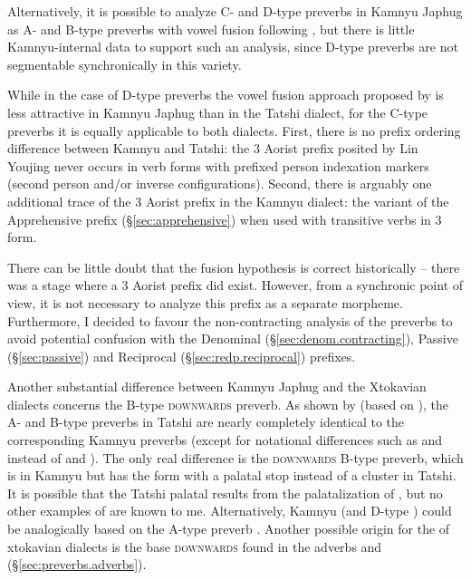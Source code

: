 Alternatively, it is possible to analyze C- and D-type preverbs in Kamnyu Japhug as A- and B-type preverbs with vowel fusion following \citet{linluo03}, but there is little Kamnyu-internal data to support such an analysis, since D-type preverbs are not segmentable synchronically in this variety.

While in the case of D-type preverbs the vowel fusion approach proposed by \citet{linluo03} is less attractive in Kamnyu Japhug than in the Tatshi dialect, for the C-type preverbs it is equally applicable to both dialects. First, there is no prefix ordering difference  between Kamnyu and Tatshi: the 3\flobv{} Aorist  prefix posited by Lin Youjing never occurs in verb forms with prefixed person indexation markers (second person and/or inverse configurations). Second, there is arguably one additional trace of the 3\flobv{} Aorist  prefix in the Kamnyu dialect: the  variant of the Apprehensive  prefix (§\ref{sec:apprehensive}) when used with transitive verbs in 3\flobv{} form. 

There can be little doubt that the fusion hypothesis is correct historically -- there was a stage where a 3\flobv{} Aorist prefix did exist. However, from a synchronic point of view, it is not necessary to analyze this prefix as a separate morpheme. Furthermore, I decided to favour the non-contracting analysis of the preverbs to avoid potential confusion with the  Denominal (§\ref{sec:denom.contracting}), Passive (§\ref{sec:passive}) and Reciprocal (§\ref{sec:redp.reciprocal}) prefixes.

Another substantial difference between Kamnyu Japhug and the Xtokavian dialects concerns the B-type \textsc{downwards} preverb. As shown by  (based on \citealt[70]{lin11direction}), the A- and B-type preverbs in Tatshi are nearly completely identical to the corresponding Kamnyu preverbs (except for notational differences such as  and  instead of  and ). The only real difference is the \textsc{downwards} B-type preverb, which is  in Kamnyu but has the form  with a palatal stop instead of a cluster in Tatshi. It is possible that the Tatshi palatal results from the palatalization of , but no other examples of  \fl{}  are known to me. Alternatively, Kamnyu  (and D-type ) could be analogically based on the A-type preverb . Another possible origin for the  of xtokavian dialects is the base  \textsc{downwards} found in the adverbs  and  (§\ref{sec:preverbs.adverbs}).
 
